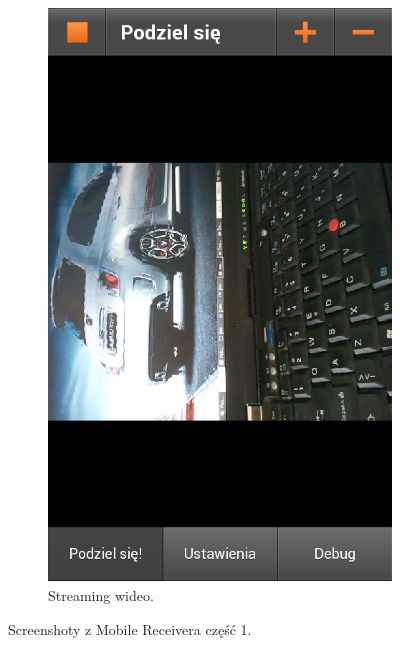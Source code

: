 \begin{figure}[h]
\begin{subfigure}{0.4\textwidth}
        \includegraphics[width=\textwidth]{img/screens/mobile_broadcaster/streaming-wideo.png}
        \caption{Streaming wideo.}
        \label{fig:MB2}
    \end{subfigure}
    \caption{Screenshoty z Mobile Receivera część 1.}
\end{figure}

